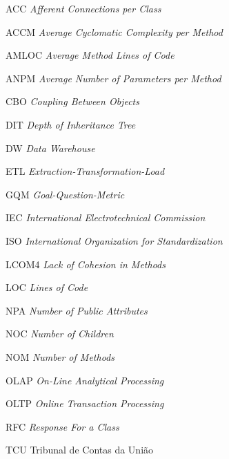 \begin{siglas}
\item [ACC]   \textit{Afferent Connections per Class}
\item [ACCM]  \textit{Average Cyclomatic Complexity per Method}
\item [AMLOC] \textit{Average Method Lines of Code}
\item [ANPM]  \textit{Average Number of Parameters per Method}
\item [CBO]   \textit{Coupling Between Objects}
\item [DIT]	  \textit{Depth of Inheritance Tree}
\item [DW]	  \textit{Data Warehouse}
\item [ETL]   \textit{Extraction-Transformation-Load}
\item [GQM]   \textit{Goal-Question-Metric}
\item [IEC]   \textit{International Electrotechnical Commission}
\item [ISO]   \textit{International Organization for Standardization}
\item [LCOM4] \textit{Lack of Cohesion in Methods}
\item [LOC]   \textit{Lines of Code}
\item [NPA]   \textit{Number of Public Attributes}
\item [NOC]   \textit{Number of Children}
\item [NOM]   \textit{Number of Methods}
\item [OLAP]  \textit{On-Line Analytical Processing}
\item [OLTP]  \textit{Online Transaction Processing}
\item [RFC]   \textit{Response For a Class}
\item [TCU]	 Tribunal de Contas	da União
\end{siglas}

